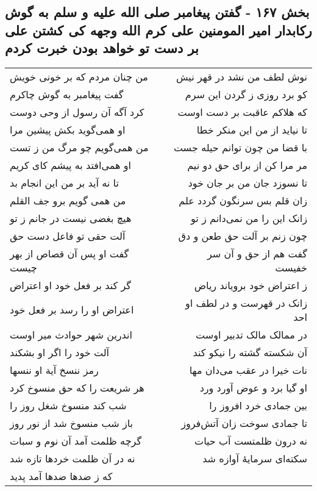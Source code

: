 \begin{center}
\section*{بخش ۱۶۷ - گفتن پیغامبر صلی الله علیه و سلم به گوش رکابدار امیر المومنین علی کرم الله  وجهه کی کشتن علی بر دست تو خواهد بودن خبرت کردم}
\label{sec:sh167}
\begin{longtable}{l p{0.5cm} r}
من چنان مردم که بر خونی خویش
&&
نوش لطف من نشد در قهر نیش
\\
گفت پیغامبر به گوش چاکرم
&&
کو برد روزی ز گردن این سرم
\\
کرد آگه آن رسول از وحی دوست
&&
که هلاکم عاقبت بر دست اوست
\\
او همی‌گوید بکش پیشین مرا
&&
تا نیاید از من این منکر خطا
\\
من همی‌گویم چو مرگ من ز تست
&&
با قضا من چون توانم حیله جست
\\
او همی‌افتد به پیشم کای کریم
&&
مر مرا کن از برای حق دو نیم
\\
تا نه آید بر من این انجام بد
&&
تا نسوزد جان من بر جان خود
\\
من همی گویم برو جف القلم
&&
زان قلم بس سرنگون گردد علم
\\
هیچ بغضی نیست در جانم ز تو
&&
زانک این را من نمی‌دانم ز تو
\\
آلت حقی تو فاعل دست حق
&&
چون زنم بر آلت حق طعن و دق
\\
گفت او پس آن قصاص از بهر چیست
&&
گفت هم از حق و آن سر خفیست
\\
گر کند بر فعل خود او اعتراض
&&
ز اعتراض خود برویاند ریاض
\\
اعتراض او را رسد بر فعل خود
&&
زانک در قهرست و در لطف او احد
\\
اندرین شهر حوادث میر اوست
&&
در ممالک مالک تدبیر اوست
\\
آلت خود را اگر او بشکند
&&
آن شکسته گشته را نیکو کند
\\
رمز ننسخ آیة او ننسها
&&
نات خیرا در عقب می‌دان مها
\\
هر شریعت را که حق منسوخ کرد
&&
او گیا برد و عوض آورد ورد
\\
شب کند منسوخ شغل روز را
&&
بین جمادی خرد افروز را
\\
باز شب منسوخ شد از نور روز
&&
تا جمادی سوخت زان آتش‌فروز
\\
گرچه ظلمت آمد آن نوم و سبات
&&
نه درون ظلمتست آب حیات
\\
نه در آن ظلمت خردها تازه شد
&&
سکته‌ای سرمایهٔ آوازه شد
\\
که ز ضدها ضدها آمد پدید

\end{longtable}
\end{center}
